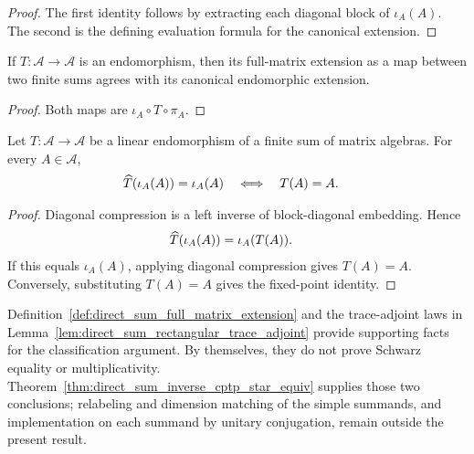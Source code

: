\begin{proof}\leanok
    The first identity follows by extracting each diagonal block of
    $\iota_A(A)$. The second is the defining evaluation formula for the
    canonical extension.
\end{proof}

\begin{theorem}
    \label{thm:direct_sum_map_extension_self}
    \leanok
    If $T:\mathcal A\to\mathcal A$ is an endomorphism, then its full-matrix
    extension as a map between two finite sums agrees with its canonical
    endomorphic extension.
\end{theorem}

\begin{proof}\leanok
    Both maps are $\iota_A\circ T\circ\pi_A$.
\end{proof}

\begin{theorem}
    \label{thm:direct_sum_extension_embedding_fixed}
    \leanok
    Let $T:\mathcal A\to\mathcal A$ be a linear endomorphism of a finite sum
    of matrix algebras. For every $A\in\mathcal A$,
    \begin{align}
        \widehat T(\iota_A(A))=\iota_A(A)
        &\quad\Longleftrightarrow\quad T(A)=A.
        \notag
    \end{align}
\end{theorem}

\begin{proof}\leanok
    Diagonal compression is a left inverse of block-diagonal embedding. Hence
    \begin{align}
        \widehat T(\iota_A(A))
        &=\iota_A(T(A)).
        \notag
    \end{align}
    If this equals $\iota_A(A)$, applying diagonal compression gives
    $T(A)=A$. Conversely, substituting $T(A)=A$ gives the fixed-point
    identity.
\end{proof}

Definition~\ref{def:direct_sum_full_matrix_extension} and the trace-adjoint
laws in Lemma~\ref{lem:direct_sum_rectangular_trace_adjoint} provide
supporting facts for the classification argument. By themselves, they do
not prove Schwarz equality or multiplicativity.
Theorem~\ref{thm:direct_sum_inverse_cptp_star_equiv} supplies those two
conclusions; relabeling and dimension matching of the simple summands, and
implementation on each summand by unitary conjugation, remain outside the
present result.

